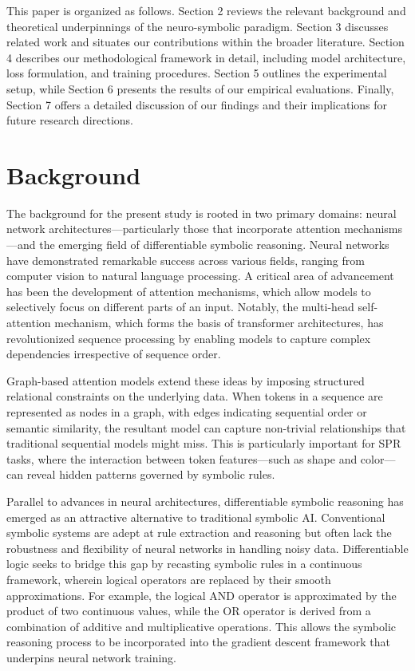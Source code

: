 \documentclass[11pt]{article}
\begin{document}
This paper is organized as follows. Section 2 reviews the relevant background and theoretical underpinnings of the neuro-symbolic paradigm. Section 3 discusses related work and situates our contributions within the broader literature. Section 4 describes our methodological framework in detail, including model architecture, loss formulation, and training procedures. Section 5 outlines the experimental setup, while Section 6 presents the results of our empirical evaluations. Finally, Section 7 offers a detailed discussion of our findings and their implications for future research directions.

\section{Background}
The background for the present study is rooted in two primary domains: neural network architectures—particularly those that incorporate attention mechanisms—and the emerging field of differentiable symbolic reasoning. Neural networks have demonstrated remarkable success across various fields, ranging from computer vision to natural language processing. A critical area of advancement has been the development of attention mechanisms, which allow models to selectively focus on different parts of an input. Notably, the multi-head self-attention mechanism, which forms the basis of transformer architectures, has revolutionized sequence processing by enabling models to capture complex dependencies irrespective of sequence order.

Graph-based attention models extend these ideas by imposing structured relational constraints on the underlying data. When tokens in a sequence are represented as nodes in a graph, with edges indicating sequential order or semantic similarity, the resultant model can capture non-trivial relationships that traditional sequential models might miss. This is particularly important for SPR tasks, where the interaction between token features—such as shape and color—can reveal hidden patterns governed by symbolic rules.

Parallel to advances in neural architectures, differentiable symbolic reasoning has emerged as an attractive alternative to traditional symbolic AI. Conventional symbolic systems are adept at rule extraction and reasoning but often lack the robustness and flexibility of neural networks in handling noisy data. Differentiable logic seeks to bridge this gap by recasting symbolic rules in a continuous framework, wherein logical operators are replaced by their smooth approximations. For example, the logical AND operator is approximated by the product of two continuous values, while the OR operator is derived from a combination of additive and multiplicative operations. This allows the symbolic reasoning process to be incorporated into the gradient descent framework that underpins neural network training.
\end{document}
